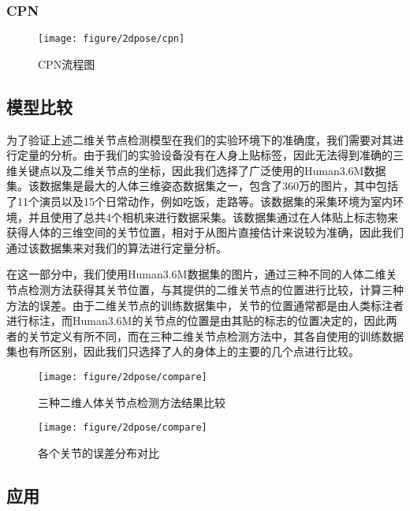 \subsubsection{CPN}
\begin{figure}[H]
    \centering
    \texttt{[image: figure/2dpose/cpn]}
    \caption{\label{fig:2d-cpn} CPN流程图}
\end{figure}

\subsection{模型比较}
为了验证上述二维关节点检测模型在我们的实验环境下的准确度，我们需要对其进行定量的分析。由于我们的实验设备没有在人身上贴标签，因此无法得到准确的三维关键点以及二维关节点的坐标，因此我们选择了广泛使用的Human3.6M数据集。该数据集是最大的人体三维姿态数据集之一，包含了360万的图片，其中包括了11个演员以及15个日常动作，例如吃饭，走路等。该数据集的采集环境为室内环境，并且使用了总共4个相机来进行数据采集。该数据集通过在人体贴上标志物来获得人体的三维空间的关节位置，相对于从图片直接估计来说较为准确，因此我们通过该数据集来对我们的算法进行定量分析。

在这一部分中，我们使用Human3.6M数据集的图片，通过三种不同的人体二维关节点检测方法获得其关节位置，与其提供的二维关节点的位置进行比较，计算三种方法的误差。由于二维关节点的训练数据集中，关节的位置通常都是由人类标注者进行标注，而Human3.6M的关节点的位置是由其贴的标志的位置决定的，因此两者的关节定义有所不同，而在三种二维关节点检测方法中，其各自使用的训练数据集也有所区别，因此我们只选择了人的身体上的主要的几个点进行比较。

\begin{figure}[H]
    \centering
    \texttt{[image: figure/2dpose/compare]}
    \caption{\label{fig:2d-compare} 三种二维人体关节点检测方法结果比较}
\end{figure}

\begin{figure}[H]
    \centering
    \texttt{[image: figure/2dpose/compare]}
    \caption{\label{fig:2d-loss} 各个关节的误差分布对比}
\end{figure}


\subsection{应用}

